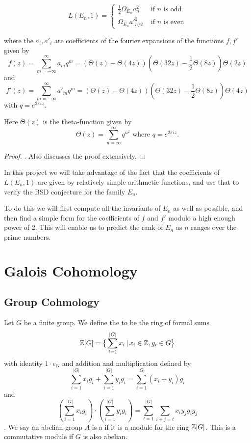 \documentclass[12pt, a4paper]{amsart}
\begin{document}
\begin{thm}
  \begin{equation} \label{eq:tunnell}
    L(E_n,1) = \begin{cases}
      \frac{1}{2}\Omega_{E_n}a^2_n & \text{ if $n$ is odd} \\
      \Omega_{E_n}a'^2_{n/2} & \text{ if $n$ is even}
    \end{cases}
  \end{equation}

  where the $a_i, a'_i$ are coefficients of the fourier expansions of the
  functions $f, f'$ given by
  \[f(z) = \sum\limits_{m=-\infty}^\infty a_m q^m
    = (\Theta(z) - \Theta(4z)) (\Theta(32z)-\frac{1}{2} \Theta(8z)) \Theta(2z)\]
  and
  \[f'(z) = \sum\limits_{m=-\infty}^\infty a'_m q^m =
    (\Theta(z) - \Theta(4z)) (\Theta(32z)-\frac{1}{2} \Theta(8z)) \Theta(4z)\]
  with $q = e^{2\pi i z}$.
  
  Here $\Theta(z)$ is the theta-function given by
  \[ \Theta(z) = \sum\limits_{n = \infty}^{\infty} q^{n^2} \text{ where } q =
    e^{2\pi iz}.\]
\end{thm}

\begin{proof}
  \cite[See][pages 325-328]{Tunnell}. Also \cite[pages 212-222]{modular}
  discusses the proof extensively.
\end{proof}
  
In this project we will take advantage of the fact that the coefficients of
$L(E_n,1)$ are given by relatively simple arithmetic functions, and use that
to verify the BSD conjecture for the family $E_n$.

To do this we will first compute all the invariants of $E_n$ as well as
possible, and then find a simple form for the coefficients of $f$ and $f'$ modulo
a high enough power of 2. This will enable us to predict the rank of $E_n$ as
$n$ ranges over the prime numbers.


  
\section{Galois Cohomology}

\subsection{Group Cohmology}

Let $G$ be a finite group. We define the  to
be the ring of formal sums
\[ {\mathbb Z}[G] = \big\{ \sum\limits_{i=1}^{|G|} x_i \, | \, x_i \in {\mathbb Z}, g_i \in G \big\}\]
with identity $1 \cdot e_G$ and addition and multiplication defined by
\[\sum\limits_{i=1}^{|G|} x_ig_i + \sum\limits_{i=1}^{|G|} y_ig_i =
\sum\limits_{i=1}^{|G|} (x_i+y_i)g_i\]
and \[(\sum\limits_{i=1}^{|G|} x_ig_i) \cdot (\sum\limits_{i=1}^{|G|} y_ig_i) =
\sum\limits_{t=1}^{|G|} \sum\limits_{i+j = t} x_iy_jg_ig_j \].
We say an abelian group $A$ is a  if it is a module
for the ring ${\mathbb Z}[G]$. This is a commutative module if $G$ is also abelian.
\end{document}
